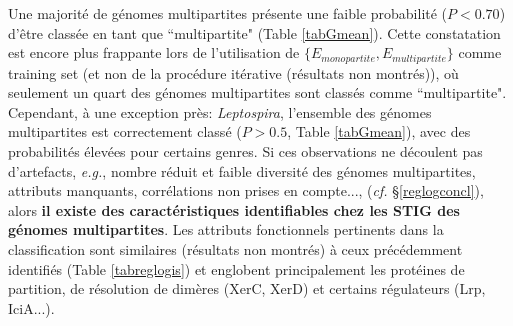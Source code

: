 Une majorité de génomes multipartites présente une faible probabilité ($P<0.70$) d'être classée en tant que ``multipartite" (Table \ref{tabGmean}). Cette constatation est encore plus frappante lors de l'utilisation de  $\{E_{monopartite},E_{multipartite}\}$ comme training set (et non de la procédure itérative (résultats non montrés)), où seulement un quart des génomes multipartites sont classés comme ``multipartite". Cependant, à une exception près: \textit{Leptospira}, l'ensemble des génomes multipartites est correctement classé ($P>0.5$, Table \ref{tabGmean}),  avec des probabilités élevées pour certains genres. Si ces observations ne découlent pas d'artefacts, \textit{e.g.}, nombre réduit et faible diversité des génomes multipartites, attributs manquants, corrélations non prises en compte..., (\textit{cf.} \S  \ref{reglogconcl}), alors \textbf{\color{orange}il existe des caractéristiques identifiables chez les STIG des génomes multipartites}. Les attributs fonctionnels pertinents dans la classification sont similaires (résultats non montrés) à ceux précédemment identifiés  (Table \ref{tabreglogis}) et englobent principalement les protéines de partition, de résolution de dimères (XerC, XerD) et certains régulateurs (Lrp, IciA...).
	  

	  
